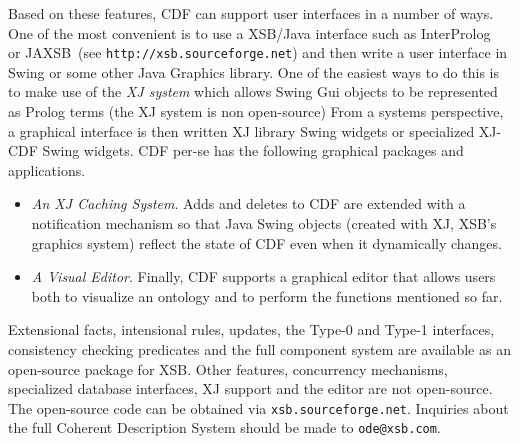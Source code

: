 Based on these features, CDF can support user interfaces in a number
of ways.  One of the most convenient is to use a XSB/Java interface
such as InterProlog~\cite{Cale01} or JAXSB~(see
\texttt{http://xsb.sourceforge.net}) and then write a user interface in
Swing or some other Java Graphics library.  One of the easiest ways to
do this is to make use of the {\em XJ system} which allows Swing Gui
objects to be represented as Prolog terms (the XJ system is non
open-source) From a systems perspective, a graphical interface is then
written XJ library Swing widgets or specialized XJ-CDF Swing widgets.
CDF per-se has the following graphical packages and applications.
%
\begin{itemize}
%
\item {\em An XJ Caching System}. Adds and deletes to CDF are extended
with a notification mechanism so that Java Swing objects (created with
XJ, XSB's graphics system) reflect the state of CDF even when it
dynamically changes.
%
\item {\em A Visual Editor}. Finally,  CDF supports a graphical editor
that allows users both to visualize an ontology and to perform the
functions mentioned so far.
\end{itemize}
%
Extensional facts, intensional rules, updates, the Type-0 and Type-1
interfaces, consistency checking predicates and the full component
system are available as an open-source package for XSB.  Other
features, concurrency mechanisms, specialized database interfaces, XJ
support and the editor are not open-source.  The open-source code can
be obtained via \texttt{xsb.sourceforge.net}.  Inquiries about the full
Coherent Description System should be made to
\texttt{ode@xsb.com}.



